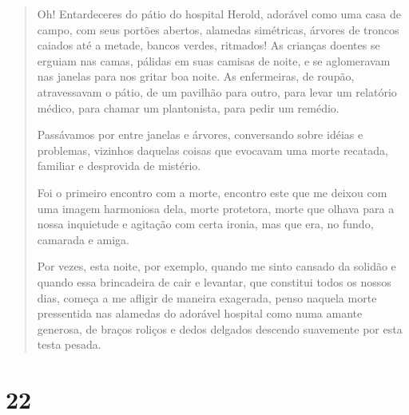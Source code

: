 \begin{quote}
Oh! Entardeceres do pátio do hospital Herold, adorável como uma casa de
campo, com seus portões abertos, alamedas simétricas, árvores de troncos
caiados até a metade, bancos verdes, ritmados! As crianças doentes se
erguiam nas camas, pálidas em suas camisas de noite, e se aglomeravam
nas janelas para nos gritar boa noite. As enfermeiras, de roupão,
atravessavam o pátio, de um pavilhão para outro, para levar um relatório
médico, para chamar um plantonista, para pedir um remédio.

Passávamos por entre janelas e árvores, conversando sobre idéias e
problemas, vizinhos daquelas coisas que evocavam uma morte recatada,
familiar e desprovida de mistério.

Foi o primeiro encontro com a morte, encontro este que me deixou com uma
imagem harmoniosa dela, morte protetora, morte que olhava para a nossa
inquietude e agitação com certa ironia, mas que era, no fundo, camarada
e amiga.

Por vezes, esta noite, por exemplo, quando me sinto cansado da solidão e
quando essa brincadeira de cair e levantar, que constitui todos os
nossos dias, começa a me afligir de maneira exagerada, penso naquela
morte pressentida nas alamedas do adorável hospital como numa amante
generosa, de braços roliços e dedos delgados descendo suavemente por
esta testa pesada.
\end{quote}

\section{22}\label{section-21}

